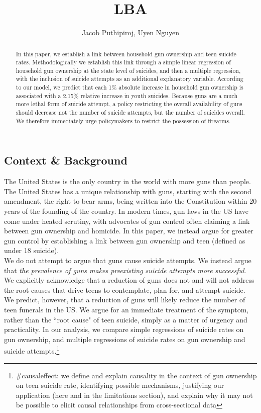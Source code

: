 \documentclass{article}
\begin{document}
\title{\vspace{-2.0cm} LBA}
\author{Jacob Puthipiroj, Uyen Nguyen}
\maketitle

\begin{abstract}
	In this paper, we establish a link between household gun ownership and teen suicide rates. Methodologically we establish this link through a simple linear regression of household gun ownership at the state level of suicides, and then a multiple regression, with the inclusion of suicide attempts as an additional explanatory variable. According to our model,  we predict that each 1\% absolute increase in household gun ownership is associated with a 2.15\% relative increase in youth suicides. Because guns are a much more lethal form of suicide attempt, a policy restricting the overall availability of guns should decrease not the number of suicide attempts, but the number of suicides overall. We therefore immediately urge policymakers to restrict the possession of firearms.
\end{abstract}

\subsection*{Context \& Background}
The United States is the only country in the world with more guns than people. The United States has a unique relationship with guns, starting with the second amendment, the right to bear arms, being written into the Constitution within 20 years of the founding of the country. In modern times, gun laws in the US have come under heated scrutiny, with advocates of gun control often claiming a link between gun ownership and homicide. In this paper, we instead argue for greater gun control by establishing a link between gun ownership and teen (defined as under 18 suicide). \\

We do not attempt to argue that guns cause suicide attempts. We instead argue that \textit{the prevalence of guns makes preexisting suicide attempts more successful}. We explicitly acknowledge that a reduction of guns does not and will not address the root causes that drive teens to contemplate, plan for, and attempt suicide. We predict, however, that a reduction of guns will likely reduce the number of teen funerals in the US. We argue for an immediate treatment of the symptom, rather than the ``root cause" of teen suicide, simply as a matter of urgency and practicality. In our analysis, we compare simple regressions of suicide rates on gun ownership, and multiple regressions of suicide rates on gun ownership and suicide attempts.\footnote{\#causaleffect: we define and explain causality in the context of gun ownership on teen suicide rate, identifying possible mechanisms, justifying our application (here and in the limitations section), and explain why it may not be possible to elicit causal relationships from cross-sectional data}\\
\end{document}
